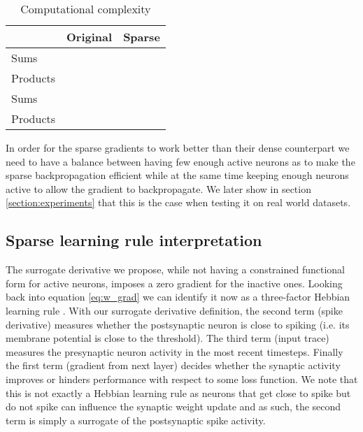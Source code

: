 \documentclass{article}
\begin{document}
\begin{table}[h]
  \caption{Computational complexity}
  \centering
  \begin{tabular}{lll}
    \toprule
                              & Original     & Sparse \\
    \midrule
    Sums      &         &   \\
    Products  &         &   \\
    Sums      &         &   \\
    Products  &         &   \\
    \bottomrule
  \end{tabular}
  \label{table:complexity}
\end{table}

In order for the sparse gradients to work better than their dense counterpart we need to have a balance between having few enough active neurons as to make the sparse backpropagation efficient while at the same time keeping enough neurons active to allow the gradient to backpropagate. We later show in section \ref{section:experiments} that this is the case when testing it on real world datasets. 


\subsection{Sparse learning rule interpretation}

The surrogate derivative we propose, while not having a constrained functional form for active neurons, imposes a zero gradient for the inactive ones. Looking back into equation \eqref{eq:w_grad} we can identify it now as a three-factor Hebbian learning rule \cite{gerstner2018eligibility}. With our surrogate derivative definition, the second term (spike derivative) measures whether the postsynaptic neuron is close to spiking (i.e. its membrane potential is close to the threshold). The third term (input trace) measures the presynaptic neuron activity in the most recent timesteps. Finally the first term (gradient from next layer) decides whether the synaptic activity improves or hinders performance with respect to some loss function. We note that this is not exactly a Hebbian learning rule as neurons that get close to spike but do not spike can influence the synaptic weight update and as such, the second term is simply a surrogate of the postsynaptic spike activity.
 
\end{document}
